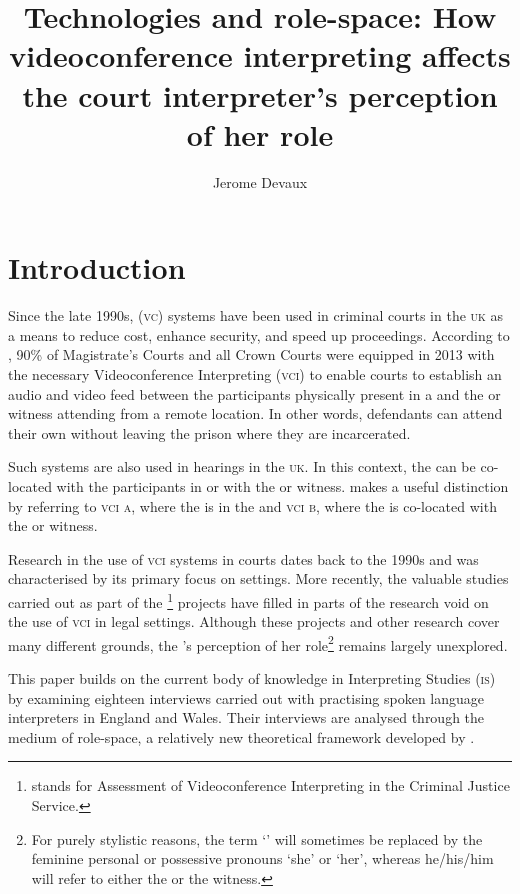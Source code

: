 \documentclass[output=paper]{langsci/langscibook}
\author{Jerome Devaux\affiliation{The Open University}}
\title{Technologies and role-space: How videoconference interpreting affects the court interpreter’s perception of her role}
\begin{document}
\section{Introduction}
\label{sec:devaux:1}
Since the late 1990s,  (\textsc{vc}) systems have been used in criminal courts in the \textsc{uk} \citep{Plotnikoff1999, Plotnikoff2000} as a means to reduce cost, enhance security, and speed up proceedings. According to \citep{Braun2016b}, 90\% of Magistrate’s Courts and all Crown Courts were equipped in 2013 with the necessary Videoconference Interpreting (\textsc{vci})  to enable courts to establish an audio and video feed between the participants physically present in a  and the  or witness attending from a remote location. In other words, defendants can attend their own  without leaving the prison where they are incarcerated. 

Such systems are also used in   hearings in the \textsc{uk}. In this context, the  can be co-located with the participants in  or with the  or witness. \citet{Braun2011a} makes a useful distinction by referring to \textsc{vci} \textsc{a}, where the  is in the  and \textsc{vci b}, where the  is co-located with the  or witness. 

Research in the use of \textsc{vci} systems in courts dates back to the 1990s and was characterised by its primary focus on   settings. More recently, the valuable studies carried out as part of the \footnote{ stands for Assessment of Videoconference Interpreting in the Criminal Justice Service.}  projects have filled in parts of the research void on the use of \textsc{vci}  in  legal settings. Although these projects and other research cover many different grounds, the ’s perception of her role\footnote{For purely stylistic reasons, the term ‘’ will sometimes be replaced by the feminine personal or possessive pronouns ‘she’ or ‘her’, whereas he/his/him will refer to either the  or the witness.} remains largely unexplored. 

This paper builds on the current body of knowledge in Interpreting Studies (\textsc{is}) by examining eighteen interviews carried out with practising spoken language  interpreters in England and Wales. Their interviews are analysed through the medium of role-space, a relatively new theoretical framework developed by \citet{Llewellyn-Jones2014}.
\end{document}
